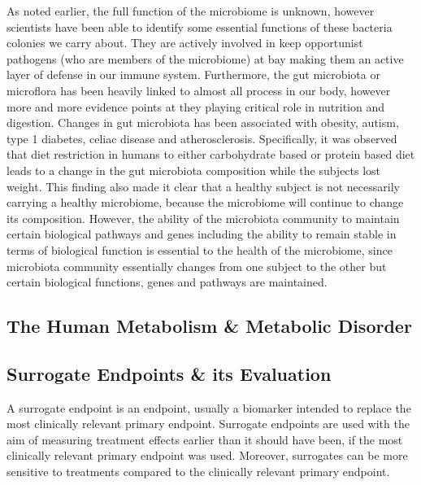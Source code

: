 \documentclass[a4paper,12pt]{article}
\begin{document}
	As noted earlier, the full function of the microbiome is unknown, however scientists have been able to identify some essential functions of these bacteria colonies we carry about. They are actively involved in keep opportunist pathogens (who are members of the microbiome) at bay making them an active layer of defense in our immune system\citep{microbiome101,healthymicrobiome}.  Furthermore, the gut microbiota or microflora has been heavily linked to almost all process in our body\citep{microbiome101}, however more and more evidence points at they playing critical role in nutrition and digestion\citep{microbiome101,healthymicrobiome}. Changes in gut microbiota has been associated with obesity, autism, type 1 diabetes, celiac disease and atherosclerosis\citep{healthymicrobiome}. Specifically, it was observed that diet restriction in humans to either carbohydrate based or protein based diet leads to a change in the gut microbiota composition while the subjects lost weight\citep{ursell}. This finding also made it clear that a healthy subject is not necessarily carrying a healthy microbiome, because the microbiome will continue to change its composition\citep{healthymicrobiome}. However, the ability of the microbiota community to maintain certain biological pathways and genes including the ability to remain stable in terms of biological function is essential to the health of the microbiome, since microbiota community essentially changes from one subject to the other but certain biological functions, genes and pathways are maintained\citep{microbiome101}.
	
	\subsection{The Human Metabolism \& Metabolic Disorder} 
	
	\subsection{Surrogate Endpoints \& its Evaluation}
	A surrogate endpoint is an endpoint, usually a biomarker intended to replace the most clinically relevant primary endpoint\citep{buyseM,surrogate1,surrogate2}. Surrogate endpoints are used with the aim of measuring treatment effects earlier than it should have been, if the most clinically relevant primary endpoint was used\citep{buyseM}. Moreover, surrogates can be more sensitive to treatments compared to the clinically relevant primary endpoint\citep{buyseM,surrogate1,surrogate2}.\\
	
\end{document}
